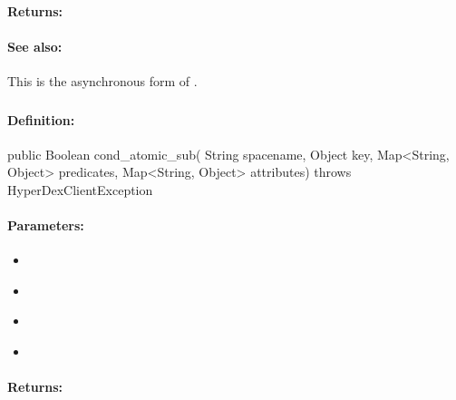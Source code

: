 \paragraph{Returns:}


\paragraph{See also:}  This is the asynchronous form of .

\pagebreak
\subsubsection{}
\label{api:java:cond_atomic_sub}


\paragraph{Definition:}
\begin{javacode}
public Boolean cond_atomic_sub(
        String spacename,
        Object key,
        Map<String, Object> predicates,
        Map<String, Object> attributes) throws HyperDexClientException
\end{javacode}

\paragraph{Parameters:}
\begin{itemize}[noitemsep]
\item {}\\

\item {}\\

\item {}\\

\item {}\\

\end{itemize}

\paragraph{Returns:}


